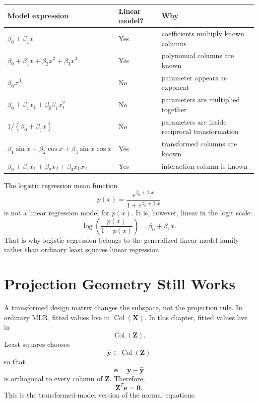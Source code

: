 \begin{center}
\begin{tabular}{p{}p{}p{}}
\toprule
Model expression & Linear model? & Why \\
\midrule
\(\beta_0+\beta_1x\) & Yes & coefficients multiply known columns \\
\(\beta_0+\beta_1x+\beta_2x^2+\beta_3x^3\) & Yes & polynomial columns are known \\
\(\beta_0x^{\beta_1}\) & No & parameter appears as exponent \\
\(\beta_0+\beta_1x_1+\beta_0\beta_1x_1^2\) & No & parameters are multiplied together \\
\(1/(\beta_0+\beta_1x)\) & No & parameters are inside reciprocal transformation \\
\(\beta_1\sin x+\beta_2\cos x+\beta_3\sin x\cos x\) & Yes & transformed columns are known \\
\(\beta_0+\beta_1x_1+\beta_2x_2+\beta_3x_1x_2\) & Yes & interaction column is known \\
\bottomrule
\end{tabular}
\end{center}

The logistic regression mean function
\begin{equation}
  p(x)=\frac{e^{\beta_0+\beta_1x}}{1+e^{\beta_0+\beta_1x}}
\end{equation}
is not a linear regression model for \(p(x)\).  It is, however, linear in the logit scale:
\begin{equation}
  \log\left(\frac{p(x)}{1-p(x)}\right)=\beta_0+\beta_1x.
\end{equation}
That is why logistic regression belongs to the generalized linear model family rather than ordinary least squares linear regression.

\section{Projection Geometry Still Works}

A transformed design matrix changes the subspace, not the projection rule.  In ordinary MLR, fitted values live in \(\operatorname{Col}(\mathbf{X})\).  In this chapter, fitted values live in
\begin{equation}
  \operatorname{Col}(\mathbf{Z}).
\end{equation}
Least squares chooses
\begin{equation}
  \widehat{\mathbf{y}}\in\operatorname{Col}(\mathbf{Z})
\end{equation}
so that
\begin{equation}
  \mathbf{e}=\mathbf{y}-\widehat{\mathbf{y}}
\end{equation}
is orthogonal to every column of \(\mathbf{Z}\).  Therefore,
\begin{equation}
  \mathbf{Z}^T\mathbf{e}=\mathbf{0}.
\end{equation}
This is the transformed-model version of the normal equations.

